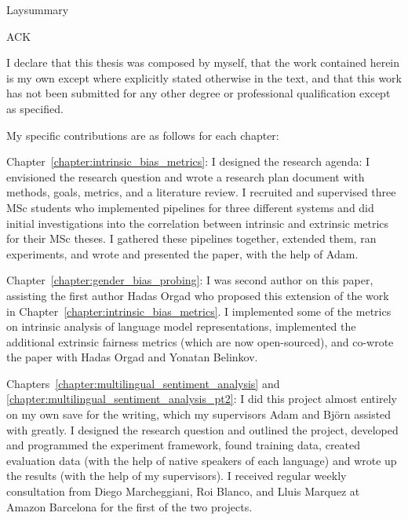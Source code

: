 \documentclass[phd,ilcc,oneside,leftchapter,parskip]{infthesis}
\begin{document}
\begin{preliminary}

\maketitle

\begin{laysummary}
Laysummary
\end{laysummary}

\begin{acknowledgements}
ACK


\end{acknowledgements}


\begin{declaration}
   I declare that this thesis was composed by myself,
   that the work contained herein is my own 
   except where explicitly stated otherwise in the text,
   and that this work has not been submitted for any other degree or
   professional qualification except as specified.

   My specific contributions are as follows for each chapter:
   
   Chapter~\ref{chapter:intrinsic_bias_metrics}: I designed the research agenda: I envisioned the research question and wrote a research plan document with methods, goals, metrics, and a literature review. I recruited and supervised three MSc students who implemented pipelines for three different systems and did initial investigations into the correlation between intrinsic and extrinsic metrics for their MSc theses. I gathered these pipelines together, extended them, ran experiments, and wrote and presented the paper, with the help of Adam. 

   Chapter~\ref{chapter:gender_bias_probing}: I was second author on this paper, assisting the first author Hadas Orgad who proposed this extension of the work in Chapter~\ref{chapter:intrinsic_bias_metrics}. I implemented some of the metrics on intrinsic analysis of language model representations, implemented the additional extrinsic fairness metrics (which are now open-sourced), and co-wrote the paper with Hadas Orgad and Yonatan Belinkov.

   Chapters~\ref{chapter:multilingual_sentiment_analysis} and \ref{chapter:multilingual_sentiment_analysis_pt2}: I did this project almost entirely on my own save for the writing, which my supervisors Adam and Björn assisted with greatly. I designed the research question and outlined the project, developed and programmed the experiment framework, found training data, created evaluation data (with the help of native speakers of each language) and wrote up the results (with the help of my supervisors). I received regular weekly consultation from Diego Marcheggiani, Roi Blanco, and Lluis Marquez at Amazon Barcelona for the first of the two projects.


\end{declaration}
\end{preliminary}
\end{document}
